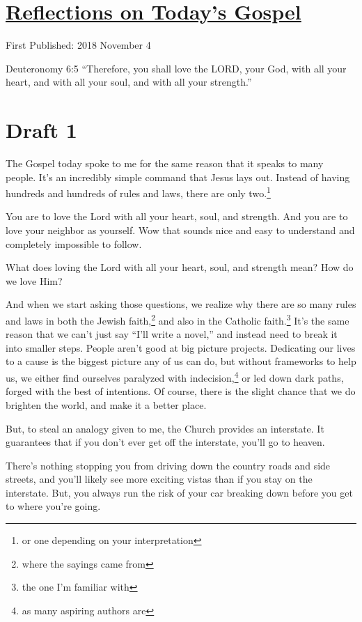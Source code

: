 \documentclass[12pt]{article}[titlepage]
\newcommand{\say}[1]{``#1''}
\newcommand{\1}{\={a}}
\newcommand{\2}{\={e}}
\newcommand{\3}{\={\i}}
\newcommand{\4}{\=o}
\newcommand{\5}{\=u}
\newcommand{\6}{\={A}}
\renewcommand{\,}{\textsuperscript{,}}
\begin{document}
\doublespacing
\section{\href{reflections-on-readings-31-ordinary-b.html}{Reflections on Today's Gospel}}
First Published: 2018 November 4

Deuteronomy 6:5 \say{Therefore, you shall love the LORD, your God, with all your heart, and with all your soul, and with all your strength.}

\section{Draft 1}
The Gospel today spoke to me for the same reason that it speaks to many people.
It's an incredibly simple command that Jesus lays out.
Instead of having hundreds and hundreds of rules and laws, there are only two.\footnote{or one depending on your interpretation}

You are to love the Lord with all your heart, soul, and strength.
And you are to love your neighbor as yourself.
Wow that sounds nice and easy to understand and completely impossible to follow.

What does loving the Lord with all your heart, soul, and strength mean?
How do we love Him?

And when we start asking those questions, we realize why there are so many rules and laws in both the Jewish faith,\footnote{where the sayings came from} and also in the Catholic faith.\footnote{the one I'm familiar with}
It's the same reason that we can't just say \say{I'll write a novel,} and instead need to break it into smaller steps.
People aren't good at big picture projects.
Dedicating our lives to a cause is the biggest picture any of us can do, but without frameworks to help us, we either find ourselves paralyzed with indecision,\footnote{as many aspiring authors are} or led down dark paths, forged with the best of intentions.
Of course, there is the slight chance that we do brighten the world, and make it a better place.

But, to steal an analogy given to me, the Church provides an interstate.
It guarantees that if you don't ever get off the interstate, you'll go to heaven.

There's nothing stopping you from driving down the country roads and side streets, and you'll likely see more exciting vistas than if you stay on the interstate.
But, you always run the risk of your car breaking down before you get to where you're going.
\end{document}
